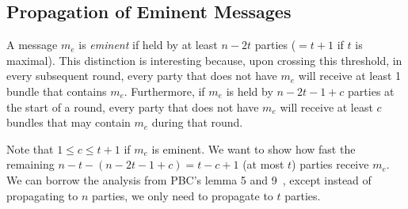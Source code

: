 \documentclass{article}
\begin{document}
\subsection{Propagation of Eminent Messages}
A message $m_e$ is \emph{eminent} if held by at least $n - 2t$ parties ($= t+1$ if $t$ is maximal). This distinction is interesting because, upon crossing this threshold, in every subsequent round, every party that does not have $m_e$ will receive at least 1 bundle that contains $m_e$. Furthermore, if $m_e$ is held by $n - 2t - 1 + c$ parties at the start of a round, every party that does not have $m_e$ will receive at least $c$ bundles that may contain $m_e$ during that round. 

Note that $1 \leq c \leq t+1$ if $m_e$ is eminent. We want to show how fast the remaining $n - t - (n - 2t - 1 + c) = t - c + 1$ (at most $t$) parties receive $m_e$. We can borrow the analysis from PBC's lemma 5 and 9~\cite{PBC}, except instead of propagating to $n$ parties, we only need to propagate to $t$ parties. 
\end{document}
